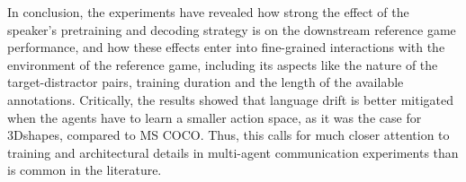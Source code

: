 In conclusion, the experiments have revealed how strong the effect of the speaker's pretraining and decoding strategy is on the downstream reference game performance, and how these effects enter into fine-grained interactions with the environment of the reference game, including its aspects like the nature of the target-distractor pairs, training duration and the length of the available annotations. Critically, the results showed that language drift is better mitigated when the agents have to learn a smaller action space, as it was the case for 3Dshapes, compared to MS COCO. Thus, this calls for much closer attention to training and architectural details in multi-agent communication experiments than is common in the literature.
